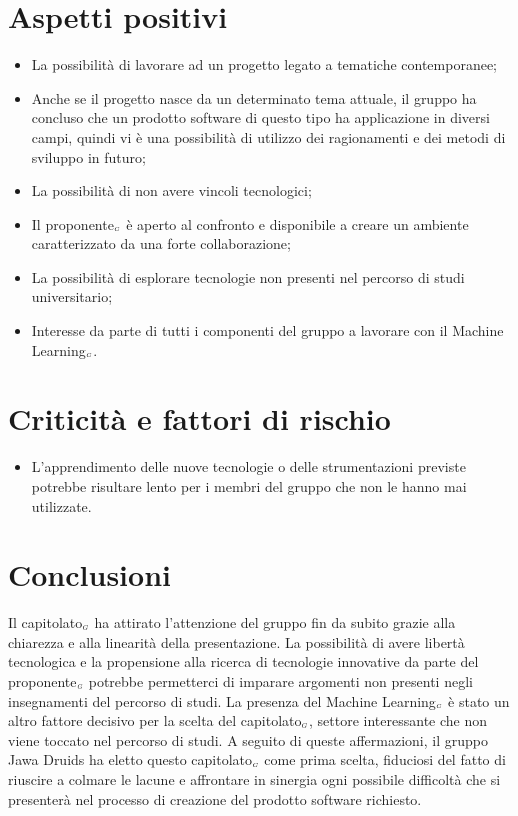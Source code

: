 \section{Aspetti positivi} \label{C3AspettiPositivi}
\begin{itemize}
	\item La possibilità di lavorare ad un progetto legato a tematiche contemporanee;
	\item Anche se il progetto nasce da un determinato tema attuale, il gruppo ha concluso che un prodotto software di questo tipo ha applicazione in diversi campi, quindi vi è una possibilità di utilizzo dei ragionamenti e dei metodi di sviluppo in futuro;
	\item La possibilità di non avere vincoli tecnologici;
	\item Il proponente$_{\scaleto{G}{3pt}}$ è aperto al confronto e disponibile a creare un ambiente caratterizzato da una forte collaborazione;
	\item La possibilità di esplorare tecnologie non presenti nel percorso di studi universitario;
	\item Interesse da parte di tutti i componenti del gruppo a lavorare con il Machine Learning$_{\scaleto{G}{3pt}}$.
\end{itemize}
\section{Criticità e fattori di rischio} \label{C3CriticitàEFattoriDiRischio}
\begin{itemize}
	\item L'apprendimento delle nuove tecnologie o delle strumentazioni previste potrebbe risultare lento per i membri del gruppo che non le hanno mai utilizzate.
\end{itemize}
\section{Conclusioni} \label{C3Conclusioni}
Il capitolato$_{\scaleto{G}{3pt}}$ ha attirato l'attenzione del gruppo fin da subito grazie alla chiarezza e alla linearità della presentazione. La possibilità di avere libertà tecnologica e la propensione alla ricerca di tecnologie innovative da parte del proponente$_{\scaleto{G}{3pt}}$ potrebbe permetterci di imparare argomenti non presenti negli insegnamenti del percorso di studi. La presenza del Machine Learning$_{\scaleto{G}{3pt}}$ è stato un altro fattore decisivo per la scelta del capitolato$_{\scaleto{G}{3pt}}$, settore interessante che non viene toccato nel percorso di studi. A seguito di queste affermazioni, il gruppo Jawa Druids ha eletto questo capitolato$_{\scaleto{G}{3pt}}$ come prima scelta, fiduciosi del fatto di riuscire a colmare le lacune e affrontare in sinergia ogni possibile difficoltà che si presenterà nel processo di creazione del prodotto software richiesto.